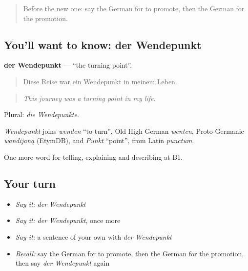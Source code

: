 \label{lesson:GE-C301-wendepunkt}



\begin{quote}
Before the new one: say the German for to promote, then the German for the promotion.
\end{quote}

\subsection*{You'll want to know: der Wendepunkt}
\textbf{der Wendepunkt} — \textquotedblleft{}the turning point\textquotedblright{}.

\begin{quote}
Diese Reise war ein Wendepunkt in meinem Leben.
\end{quote}

\begin{quote}
\emph{This journey was a turning point in my life.}
\end{quote}

Plural: \emph{die Wendepunkte}.

\begin{cousinweb}
\emph{Wendepunkt} joins \emph{wenden} \textquotedblleft{}to turn\textquotedblright{}, Old High German \emph{wenten}, Proto-Germanic \emph{wandijaną} (EtymDB), and \emph{Punkt} \textquotedblleft{}point\textquotedblright{}, from Latin \emph{punctum}.
\end{cousinweb}

\begin{grammarlens}[title={What you've built}]
One more word for telling, explaining and describing at B1.
\end{grammarlens}

\subsection*{Your turn}
\begin{itemize}
\raggedright
  \item \emph{Say it:} \emph{der Wendepunkt}
  \item \emph{Say it:} \emph{der Wendepunkt}, once more
  \item \emph{Say it:} a sentence of your own with \emph{der Wendepunkt}
  \item \emph{Recall:} say the German for to promote, then the German for the promotion, then say \emph{der Wendepunkt} again
\end{itemize}

